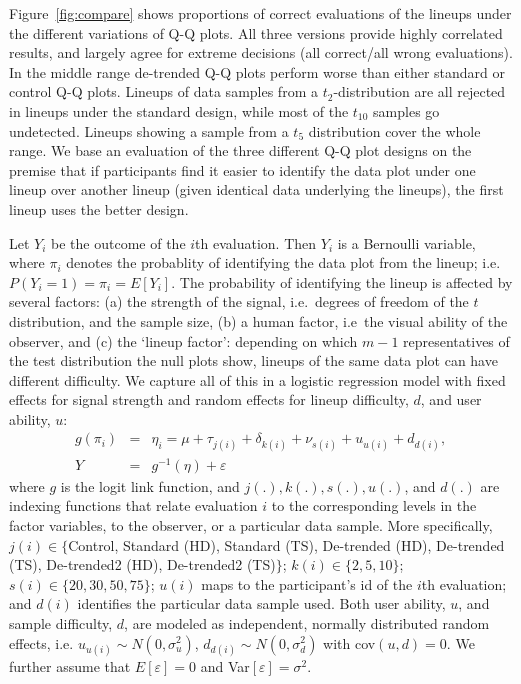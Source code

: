 \documentclass{article}\usepackage[]{graphicx}\usepackage[]{color}
\begin{document}
Figure~\ref{fig:compare} shows proportions of correct evaluations of the lineups under the different variations of Q-Q plots. All three versions provide highly correlated results, and largely agree for extreme decisions (all correct/all wrong evaluations). In the middle range de-trended Q-Q plots perform  worse than either standard or control Q-Q plots. Lineups of data samples from a $t_2$-distribution  are all rejected in lineups under the standard design, while most of the $t_{10}$ samples go undetected. Lineups showing a sample from a $t_5$ distribution cover the whole range.
We base an evaluation of the three different Q-Q plot designs on the premise that if participants find it easier to identify the data plot under one lineup over another lineup (given identical data underlying the lineups), the first lineup uses the better design.

Let $Y_i$ be the outcome of the $i$th evaluation. Then $Y_i$ is a Bernoulli variable, where $\pi_i$ denotes the probablity of identifying the data plot from the lineup; i.e.~$P(Y_i = 1) = \pi_i = E[Y_i]$.   
The probability of identifying the lineup is affected by several factors: (a) the strength of the signal, i.e.~degrees of freedom of the $t$ distribution, and the sample size, (b) a human factor, i.e~the visual ability of the observer, and (c)  the `lineup factor': depending on which $m-1$ representatives of the test distribution the null plots show, lineups of the same data plot can have different difficulty. We capture all of this in a logistic regression model with fixed effects for signal strength and random effects for lineup difficulty, $d$, and user ability, $u$: 
\begin{eqnarray*}
g(\pi_i) &=& \eta_i = \mu + \tau_{j(i)} +\delta_{k(i)}+ \nu_{s(i)} + u_{u(i)} + d_{d(i)},\\
Y &=& g^{-1}(\eta) + \varepsilon
\end{eqnarray*}
where $g$ is the logit link function, and $j(.), k(.), s(.), u(.)$, and $d(.)$ are  indexing functions that relate evaluation $i$ to the corresponding levels in the factor variables, to the observer, or a particular data sample. More specifically, $j(i) \in \{$Control, Standard (HD), Standard (TS), De-trended (HD), De-trended (TS), De-trended2 (HD), De-trended2 (TS)$\}$; $k(i) \in \{2,5,10\}$; $s(i) \in \{20, 30, 50, 75\}$; $u(i)$ maps to the participant's id of the $i$th evaluation; and $d(i)$ identifies the particular data sample used. 
Both user ability, $u$, and sample difficulty, $d$, are modeled as independent, normally distributed  random effects, i.e. $u_{u(i)} \sim N(0, \sigma_u^2)$, $d_{d(i)} \sim N(0,\sigma_d^2)$ with cov$(u, d) = 0$. We further assume that $E[\varepsilon] = 0$ and Var$[\varepsilon]=\sigma^2$.
\end{document}
